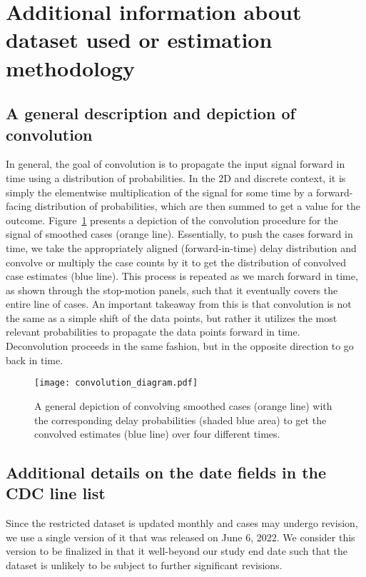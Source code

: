 \section{Additional information about dataset used or estimation methodology}

\subsection{A general description and depiction of convolution}
\label{sec:convol}

In general, the goal of convolution is to propagate the input signal forward in time using a distribution of probabilities. In the 2D and discrete context, it is simply the elementwise multiplication of the signal for some time by a forward-facing distribution of probabilities, which are then summed to get a value for the outcome. Figure~\ref{fig:convol} presents a depiction of the convolution procedure for the signal of smoothed cases (orange line). Essentially, to push the cases forward in time, we take the appropriately aligned (forward-in-time) delay distribution and convolve or multiply the case counts by it to get the distribution of convolved case estimates (blue line). This process is repeated as we march forward in time, as shown through the stop-motion panels, such that it eventually covers the entire line of cases. An important takeaway from this is that convolution is not the same as a simple shift of the data points, but rather it utilizes the most relevant probabilities to propagate the data points forward in time. Deconvolution proceeds in the same fashion, but in the opposite direction to go back in time. 

\begin{figure}[H]
\centering
    \texttt{[image: convolution\_diagram.pdf]}
    \caption{A general depiction of convolving smoothed cases (orange line) with the corresponding delay probabilities (shaded blue area) to get the convolved estimates (blue line) over four different times.}
    \label{fig:convol}
\end{figure}

\subsection{Additional details on the date fields in the CDC line list}
\label{sec:linelist-details}

Since the restricted dataset is updated
monthly and cases may undergo revision, we use a single version of it that was
released on June 6, 2022. We consider this version to be finalized in that it
well-beyond our study end date such that the dataset is unlikely to be subject
to further significant revisions.

